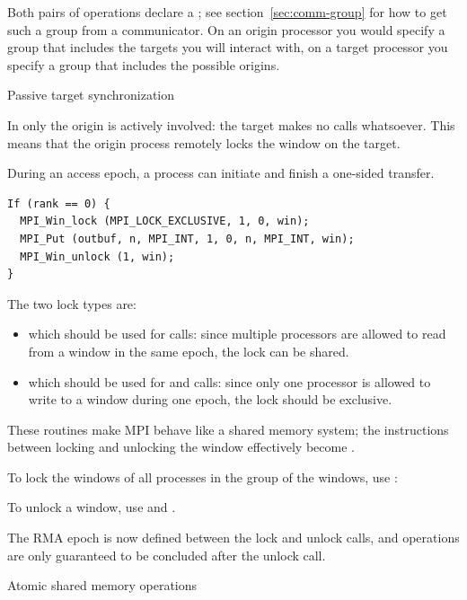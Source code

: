 Both pairs of operations declare a
; see section~\ref{sec:comm-group}
for how to get such a group from a communicator.
On an origin processor you would specify a group that includes the targets
you will interact with, on a target processor you specify a group
that includes the possible origins.

 {Passive target synchronization}
\label{sec:passive-sync}

In  only the origin is
actively involved: the target makes no calls whatsoever.
This means that the origin process remotely locks the window
on the target.

During an access epoch, a process can initiate and finish a one-sided
transfer.
\begin{lstlisting}
If (rank == 0) {
  MPI_Win_lock (MPI_LOCK_EXCLUSIVE, 1, 0, win);
  MPI_Put (outbuf, n, MPI_INT, 1, 0, n, MPI_INT, win);
  MPI_Win_unlock (1, win);
}
\end{lstlisting}
The two lock types are:
\begin{itemize}
\item {} which should be used for 
  calls: since multiple processors are allowed to read from a window
  in the same epoch, the lock can be shared.
\item {} which should be used for
   and  calls: since only one processor is
  allowed to write to a window during one epoch, the lock should be
  exclusive.
\end{itemize}
These routines make MPI behave like a shared memory system; the
instructions between locking and unlocking the window effectively
become .
%

To lock the windows of all processes in the group of the windows, use
:
%

To unlock a window, use  and
.


The RMA epoch is now defined between the lock and unlock calls, and
operations are only guaranteed to be concluded after the unlock call.

 {Atomic shared memory operations}


